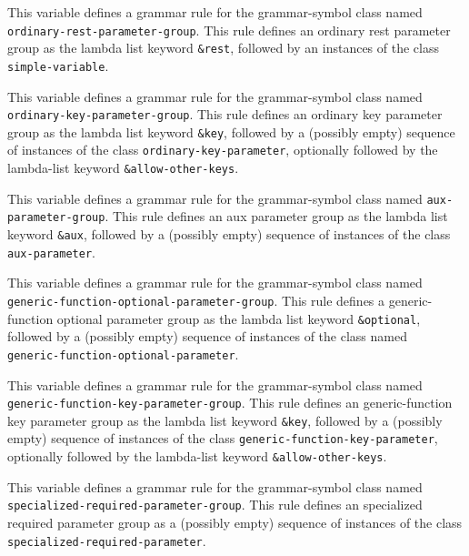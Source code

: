 
This variable defines a grammar rule for the grammar-symbol class
named \texttt{ordinary-rest-parameter-group}.  This rule defines an
ordinary rest parameter group as the lambda list keyword
\texttt{\&rest}, followed by an instances of the class
\texttt{simple-variable}.


This variable defines a grammar rule for the grammar-symbol class
named \texttt{ordinary-key-parameter-group}.  This rule defines
an ordinary key parameter group as the lambda list keyword
\texttt{\&key}, followed by a (possibly empty) sequence of
instances of the class \texttt{ordinary-key-parameter}, optionally
followed by the lambda-list keyword \texttt{\&allow-other-keys}.


This variable defines a grammar rule for the grammar-symbol class
named \texttt{aux-parameter-group}.  This rule defines an aux
parameter group as the lambda list keyword \texttt{\&aux}, followed by
a (possibly empty) sequence of instances of the class
\texttt{aux-parameter}.


This variable defines a grammar rule for the grammar-symbol class
named \texttt{generic-function-optional-parameter-group}.  This rule
defines a generic-function optional parameter group as the lambda list
keyword \texttt{\&optional}, followed by a (possibly empty) sequence
of instances of the class named\\
\texttt{generic-function-optional-parameter}.


This variable defines a grammar rule for the grammar-symbol class
named \texttt{generic-function-key-parameter-group}.  This rule
defines an generic-function key parameter group as the lambda list
keyword \texttt{\&key}, followed by a (possibly empty) sequence of
instances of the class \texttt{generic-function-key-parameter},
optionally followed by the lambda-list keyword
\texttt{\&allow-other-keys}.


This variable defines a grammar rule for the grammar-symbol class
named \texttt{specialized-required-parameter-group}.  This rule
defines an specialized required parameter group as a (possibly empty)
sequence of instances of the class
\texttt{specialized-required-parameter}.

